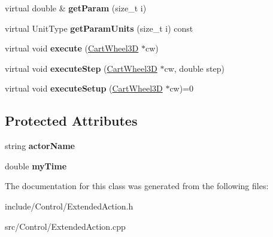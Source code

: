 \begin{DoxyCompactItemize}
\item 
\hypertarget{classCartWheel_1_1ExtendedAction_aaeb77bc017464db1925cbbf2bbc50f40}{
virtual double \& {\bfseries getParam} (size\_\-t i)}
\label{classCartWheel_1_1ExtendedAction_aaeb77bc017464db1925cbbf2bbc50f40}

\item 
\hypertarget{classCartWheel_1_1ExtendedAction_a1b3e99d38221ea110929fb49865df97a}{
virtual UnitType {\bfseries getParamUnits} (size\_\-t i) const }
\label{classCartWheel_1_1ExtendedAction_a1b3e99d38221ea110929fb49865df97a}

\item 
\hypertarget{classCartWheel_1_1ExtendedAction_ae1ebbb742baa36a4a2af33637e79848a}{
virtual void {\bfseries execute} (\hyperlink{classCartWheel_1_1CartWheel3D}{CartWheel3D} $\ast$cw)}
\label{classCartWheel_1_1ExtendedAction_ae1ebbb742baa36a4a2af33637e79848a}

\item 
\hypertarget{classCartWheel_1_1ExtendedAction_aa0340ab44df529bcb6cd8b1d213f257d}{
virtual void {\bfseries executeStep} (\hyperlink{classCartWheel_1_1CartWheel3D}{CartWheel3D} $\ast$cw, double step)}
\label{classCartWheel_1_1ExtendedAction_aa0340ab44df529bcb6cd8b1d213f257d}

\item 
\hypertarget{classCartWheel_1_1ExtendedAction_a5dc273e21281ba130b6ce533a94688e4}{
virtual void {\bfseries executeSetup} (\hyperlink{classCartWheel_1_1CartWheel3D}{CartWheel3D} $\ast$cw)=0}
\label{classCartWheel_1_1ExtendedAction_a5dc273e21281ba130b6ce533a94688e4}

\end{DoxyCompactItemize}
\subsection*{Protected Attributes}
\begin{DoxyCompactItemize}
\item 
\hypertarget{classCartWheel_1_1ExtendedAction_ac1d299eb113dc497e6cd7b3678c62d1b}{
string {\bfseries actorName}}
\label{classCartWheel_1_1ExtendedAction_ac1d299eb113dc497e6cd7b3678c62d1b}

\item 
\hypertarget{classCartWheel_1_1ExtendedAction_a71516c9c385b8a185098f6015bb555a9}{
double {\bfseries myTime}}
\label{classCartWheel_1_1ExtendedAction_a71516c9c385b8a185098f6015bb555a9}

\end{DoxyCompactItemize}


The documentation for this class was generated from the following files:\begin{DoxyCompactItemize}
\item 
include/Control/ExtendedAction.h\item 
src/Control/ExtendedAction.cpp\end{DoxyCompactItemize}
